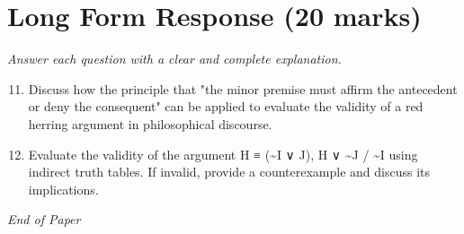 \documentclass[12pt]{article}
\begin{document}
\section*{Long Form Response (20 marks)}
\textit{Answer each question with a clear and complete explanation.}
\begin{enumerate}[label=\arabic*.]
\setcounter{enumi}{10}
\item Discuss how the principle that "the minor premise must affirm the antecedent or deny the consequent" can be applied to evaluate the validity of a red herring argument in philosophical discourse.
\item Evaluate the validity of the argument H ≡ (\textasciitilde{}I ∨ J), H ∨ \textasciitilde{}J / \textasciitilde{}I using indirect truth tables. If invalid, provide a counterexample and discuss its implications.
\end{enumerate}

\vfill
\noindent\textit{End of Paper}
\end{document}
